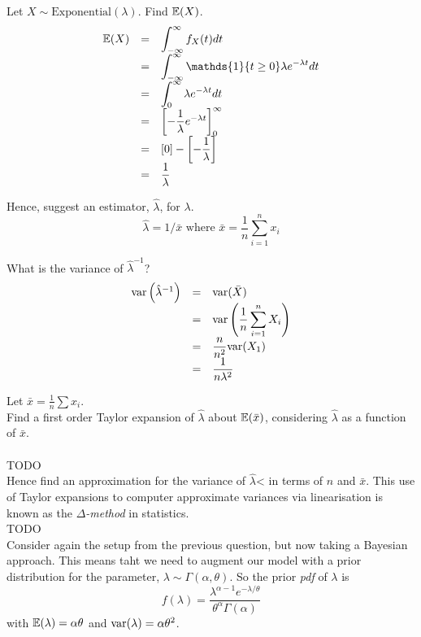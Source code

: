 \documentclass[11pt,a4paper]{article}
\begin{document}
\qpartnb Let $X\sim\text{Exponential}(\lambda)$. Find $\mathbb{E}(X)$.\\

\apart
\[\begin{array}{rcl}
\expect(X)&=&\displaystyle\int_{-\infty}^\infty f_X(t)dt\\
&=&\displaystyle\int_{-\infty}^\infty\mathds{1}\{t\geq0\}\lambda e^{-\lambda t}dt\\
&=&\displaystyle\int_0^\infty\lambda e^{-\lambda t}dt\\
&=&\left[-\dfrac{1}{\lambda}e^{-\lambda t}\right]_0^\infty\\
&=&[0]-\left[-\dfrac{1}{\lambda}\right]\\
&=&\dfrac{1}{\lambda}
\end{array}\]

\qpartnb Hence, suggest an estimator, $\hat\lambda$, for $\lambda$.\\

\apart
$$\hat\lambda=1/\bar{x}\text{ where }\bar{x}=\frac{1}{n}\sum_{i=1}^nx_i$$

\qpartnb What is the variance of $\hat\lambda^{-1}$?
\\
\apart
\[\begin{array}{rcl}
\mathrm{var}\left(\hat\lambda^{-1}\right)&=&\mathrm{var}(\bar{X})\\
&=&\mathrm{var}\left(\dfrac1n\displaystyle\sum_{i=1}^nX_i\right)\\
&=&\dfrac{n}{n^2}\mathrm{var}(X_1)\\
&=&\dfrac{1}{n\lambda^2}
\end{array}\]

\qpart
Let $\bar{x}=\frac{1}{n}\sum x_i$.\\
Find a first order Taylor expansion of $\hat\lambda$ about $\mathbb{E}(\bar{x})$, considering $\hat\lambda$ as a function of $\bar{x}$.\\
\\

\apart
TODO\\

\qpart
Hence find an approximation for the variance of $\hat\lambda$< in terms of $n$ and $\bar{x}$. This use of Taylor expansions to computer approximate variances via linearisation is known as the \textit{$\Delta$-method} in statistics.\\

\apart
TODO\\

\question
Consider again the setup from the previous question, but now taking a Bayesian approach. This means taht we need to augment our model with a prior distribution for the parameter, $\lambda\sim\Gamma(\alpha,\theta)$. So the prior \textit{pdf} of $\lambda$ is
$$f(\lambda)=\frac{\lambda^{\alpha-1}e^{-\lambda/\theta}}{\theta^\alpha\Gamma(\alpha)}$$
with $\mathbb{E}(\lambda)=\alpha\theta$ and $\mathrm{var}(\lambda)=\alpha\theta^2$.\\
\end{document}
